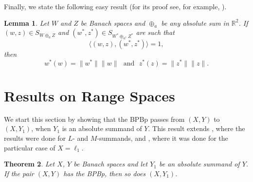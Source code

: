 \documentclass[10pt,a4paper]{amsart}
\theoremstyle{plain}
\newtheorem{theorem}{Theorem}[section]
\newtheorem{lemma}[theorem]{Lemma}
\theoremstyle{definition}
\newcommand{\R}{\mathbb{R}}
\begin{document}
Finally, we state the following easy result (for its proof see, for example, \cite[Lemma 2.2]{G}).

\begin{lemma} \label{state0} Let $W$ and $Z$ be Banach spaces and $\oplus_a$ be any absolute sum in $\R^2$. If $(w, z) \in S_{W \oplus_a Z}$ and $(w^*, z^*) \in S_{W^* \oplus_{a^*} Z^*}$ are such that 
\begin{equation*}
\langle (w, z), (w^*, z^*) \rangle = 1,
\end{equation*}
then
\begin{equation*}	
w^*(w) = \|w^*\|\|w\| \ \ \ \text{and} \ \ \ z^*(z) = \|z^*\| \|z\|.
\end{equation*}
\end{lemma}

\section{Results on Range Spaces} \label{range}
We start this section by showing that the BPBp passes from $(X, Y)$ to $(X, Y_1)$, when $Y_1$ is an absolute summand of $Y$. This result extends \cite[Propositions 2.3 and 2.7]{ACKLM}, where the results were done for $L$- and $M$-summands, and \cite[Theorem 2.3]{G}, where it was done for the particular case of $X=\ell_1$.

\begin{theorem} \label{range1} Let $X$, $Y$ be Banach spaces and let $Y_1$ be an absolute summand of $Y$. If the pair $(X, Y)$ has the BPBp, then so does $(X, Y_1)$.
\end{theorem}
\end{document}
